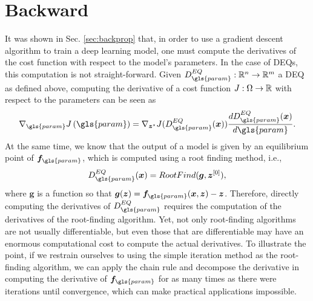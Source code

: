 \section{Backward}\label{sec:deq-backward}

It was shown in Sec. \ref{sec:backprop} that, in order to use a gradient descent algorithm to train a deep learning model, one must compute the derivatives of the cost function with respect to the model's parameters.
In the case of \gls{DEQ}s, this computation is not straight-forward.
Given $D^{EQ}_{\gls{param}}:\R^{n}\to \R^{m}$ a \gls{DEQ} as defined above, computing the derivative of a cost function $J:\Omega\to \mathbb{R}$ with respect to the parameters can be seen as \[
    \nabla_{\gls{param}} J\left( \gls{param} \right) = \nabla_{\bm{z}^{\star}} J(D^{EQ}_{\gls{param}}(\bm{x})) \frac{d D^{EQ}_{\gls{param}}(\bm{x})}{d\gls{param}}
.\] 
At the same time, we know that the output of a model is given by an equilibrium point of $\bm{f}_{\gls{param}}$, which is computed using a root finding method, i.e., \[
    D^{EQ}_{\gls{param}}(\bm{x}) = RootFind(\bm{g}, \bm{z}^{[0]})
,\] where $\bm{g}$ is a function so that $\bm{g}(\bm{z}) = \bm{f}_{\gls{param}}(\bm{x},\bm{z}) - \bm{z}$.
Therefore, directly computing the derivatives of $D^{EQ}_{\gls{param}}$ requires the computation of the derivatives of the root-finding algorithm.
Yet, not only root-finding algorithms are not usually differentiable, but even those that are differentiable may have an enormous computational cost to compute the actual derivatives.
To illustrate the point, if we restrain ourselves to using the simple iteration method as the root-finding algorithm, we can apply the chain rule and decompose the derivative in computing the derivative of $\bm{f}_{\gls{param}}$ for as many times as there were iterations until convergence, which can make practical applications impossible.


